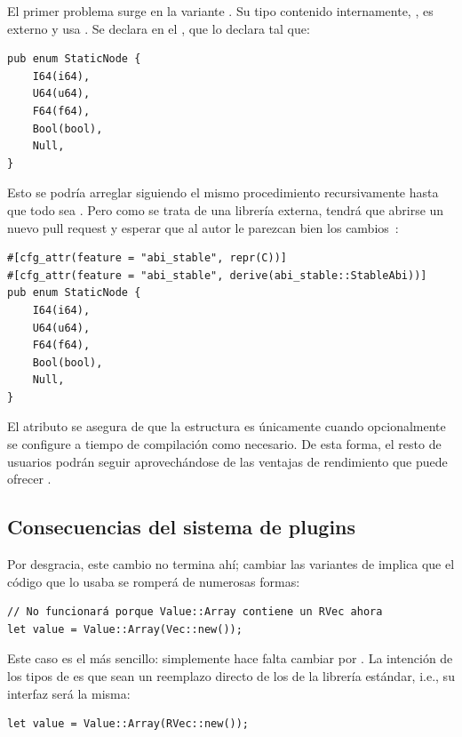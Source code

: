 El primer problema surge en la variante . Su tipo contenido
internamente, , es externo y usa . Se
declara en el \crate {}, que lo declara tal que:

\begin{verbatim}
pub enum StaticNode {
    I64(i64),
    U64(u64),
    F64(f64),
    Bool(bool),
    Null,
}
\end{verbatim}

Esto se podría arreglar siguiendo el mismo procedimiento recursivamente hasta
que todo sea \code{#[repr(C)]}. Pero como se trata de una librería externa,
tendrá que abrirse un nuevo pull request y esperar que al autor le parezcan bien
los cambios~\cite{openstaticnode}:

\begin{verbatim}
#[cfg_attr(feature = "abi_stable", repr(C))]
#[cfg_attr(feature = "abi_stable", derive(abi_stable::StableAbi))]
pub enum StaticNode {
    I64(i64),
    U64(u64),
    F64(f64),
    Bool(bool),
    Null,
}
\end{verbatim}

El atributo  se asegura de que la estructura es \code{#[repr(C)]}
únicamente cuando opcionalmente se configure a tiempo de compilación como
necesario. De esta forma, el resto de usuarios podrán seguir aprovechándose de
las ventajas de rendimiento que puede ofrecer .

\subsection{Consecuencias del sistema de plugins}

Por desgracia, este cambio no termina ahí; cambiar las variantes de 
implica que el código que lo usaba se romperá de numerosas formas:

\begin{verbatim}
// No funcionará porque Value::Array contiene un RVec ahora
let value = Value::Array(Vec::new());
\end{verbatim}

Este caso es el más sencillo: simplemente hace falta cambiar  por
. La intención de los tipos de \abistable es que sean un reemplazo
directo de los de la librería estándar, i.e., su interfaz será la misma:

\begin{verbatim}
let value = Value::Array(RVec::new());
\end{verbatim}

